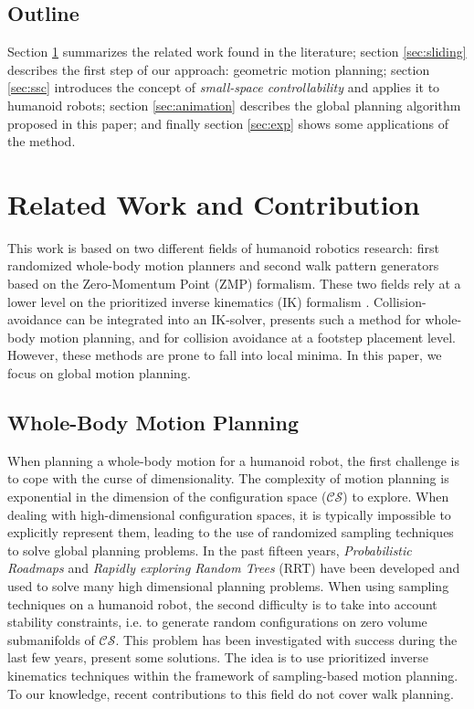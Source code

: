 \documentclass{article}
\begin{document}
\subsection{Outline}

Section \ref{sec:related-work} summarizes the related work found in the literature;
section \ref{sec:sliding} describes the first step of our approach: geometric
motion planning; section \ref{sec:ssc}
introduces the concept of \textit{small-space controllability} and applies it to humanoid robots;
section \ref{sec:animation} describes the global planning algorithm proposed in this paper; 
and finally section \ref{sec:exp} shows some applications of the method.


\section{Related Work and Contribution}
\label{sec:related-work}

This work is based on two different fields of humanoid robotics
research:  first  randomized  whole-body  motion
planners and second walk pattern generators based on the Zero-Momentum
Point (ZMP) formalism.  These two fields  rely at a lower level on the
prioritized inverse kinematics (IK)  formalism
\cite{siciliano1991gfm,nakamura1986iks}. 
Collision-avoidance
can be integrated into an IK-solver, \cite{kanehiro2008lca} presents such a method for
whole-body motion planning, and \cite{OussamaKanoun06102010} for collision avoidance at a
footstep placement level. However, these methods are prone to fall
into local minima. In this paper, we focus on global motion
planning. 


\subsection{Whole-Body Motion Planning}

When  planning a  whole-body motion  for a  humanoid robot,  the first
challenge is to cope with  the curse of dimensionality. The complexity
of   motion  planning  is   exponential  in   the  dimension   of  the
configuration  space ($\mathcal{CS}$)  to explore.  When  dealing with
high-dimensional configuration  spaces, it is  typically impossible to
explicitly represent  them, leading to the use  of randomized sampling
techniques  to solve  global planning  problems. In  the  past fifteen
years,  \textit{Probabilistic Roadmaps} \cite{kavraki1996prp} and  
\textit{Rapidly exploring Random  Trees} (RRT) 
\cite{kuffner00rrtconnect}  have been  developed and  used to  solve many
high dimensional   planning  problems.
When  using  sampling  techniques  on  a humanoid  robot,  the  second
difficulty  is to  take into  account stability  constraints,  i.e. to
generate  random  configurations   on  zero  volume  submanifolds  of
$\mathcal{CS}$. This problem has been investigated with success during
the last few years, \cite{Berenson15032011,dalibard09} present some 
solutions. The idea is to use
prioritized  inverse  kinematics techniques  within  the framework  of
sampling-based motion planning. To our knowledge, recent contributions
to this field do not cover walk planning.
\end{document}
